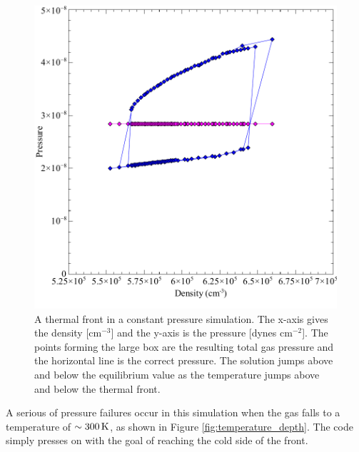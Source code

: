 \begin{figure}
\centering
\includegraphics[scale=0.5]{pressure_density}
\caption[Thermal front]{\label{fig:pressure_density}A thermal front in a
constant pressure simulation.  The x-axis
gives the density [cm$^{-3}$] and the y-axis is the pressure
[dynes cm$^{-2}$].
The
points forming the large box are the resulting total gas pressure and the
horizontal line is the correct pressure.
The solution jumps above and below
the equilibrium value as the temperature jumps above and below the thermal
front.}
\end{figure}

A serious of pressure failures occur in this simulation when the gas
falls to a temperature of $\sim 300 {\rm\thinspace K}$,
as shown in Figure \ref{fig:temperature_depth}.
The code simply
presses on with the goal of reaching the cold side of the front.

